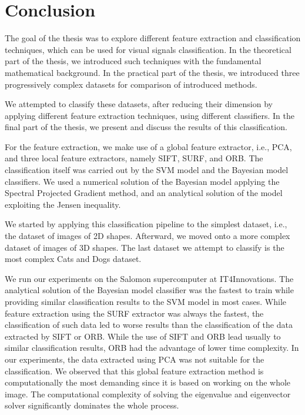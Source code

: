 \chapter{Conclusion}\label{sec:conclusion}
The goal of the thesis was to explore different feature extraction and classification techniques, which can be used for visual signals classification. In the theoretical part of the thesis, we introduced such techniques with the fundamental mathematical background. In the practical part of the thesis, we introduced three progressively complex datasets for comparison of introduced methods.

We attempted to classify these datasets, after reducing their dimension by applying different feature extraction techniques, using different classifiers. In the final part of the thesis, we present and discuss the results of this classification.

For the feature extraction, we make use of a global feature extractor, i.e., PCA, and three local feature extractors, namely SIFT, SURF, and ORB. The classification itself was carried out by the SVM model and the Bayesian model classifiers. We used a numerical solution of the Bayesian model applying the Spectral Projected Gradient method, and an analytical solution of the model exploiting the Jensen inequality.

We started by applying this classification pipeline to the simplest dataset, i.e., the dataset of images of 2D shapes. Afterward, we moved onto a more complex dataset of images of 3D shapes. The last dataset we attempt to classify is the most complex Cats and Dogs dataset.

We run our experiments on the Salomon supercomputer at IT4Innovations. The analytical solution of the Bayesian model classifier was the fastest to train while providing similar classification results to the SVM model in most cases. While feature extraction using the SURF extractor was always the fastest, the classification of such data led to worse results than the classification of the data extracted by SIFT or ORB. While the use of SIFT and ORB lead usually to similar classification results, ORB had the advantage of lower time complexity. In our experiments, the data extracted using PCA was not suitable for the classification. We observed that this global feature extraction method is computationally the most demanding since it is based on working on the whole image. The computational complexity of solving the eigenvalue and eigenvector solver significantly dominates the whole process.

